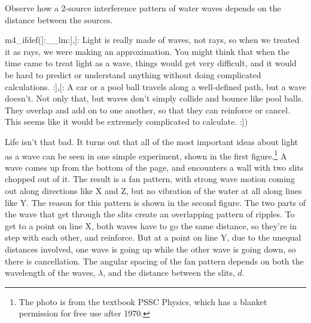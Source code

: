 \label{lab:two-source-interference}

\apparatus
{}

\begin{goals}

\item[] Observe how a 2-source interference
pattern of water waves depends on the distance between the sources.


\end{goals}

\observations

m4_ifdef([:__lm:],[:%
Light is really made of waves, not rays, so when we treated it as
rays, we were making an approximation. You might think that when
the time came to treat light as a wave, things would get very difficult,
and it would be hard to predict or understand anything without doing
complicated calculations.
:],[:%
A car or a pool ball travels along a well-defined path, but a wave doesn't.
Not only that, but waves don't simply collide and bounce like pool balls.
They overlap and add on to one another, so that they can reinforce or cancel.
This seems like it would be extremely complicated to calculate.
:])


Life isn't that bad. It turns out that all of the most important
ideas about light as a wave can be seen in one simple experiment, shown in the
first figure.\footnote{The photo is from the textbook PSSC Physics, which has
a blanket permission for free use after 1970.} A wave comes up from the bottom
of the page, and encounters a wall with two slits chopped out of it. The result
is a fan pattern, with strong wave motion coming out along directions like X and
Z, but no vibration of the water at all along lines like Y. The reason for this
pattern is shown in the second figure. The two parts of the wave that get through
the slits create an overlapping pattern of ripples. To get to a point on line X, both
waves have to go the same distance, so they're in step with each other, and
reinforce. But at a point on line Y, due to the unequal distances involved,
one wave is going up while the other wave is going down, so there is cancellation.
The angular spacing of the fan pattern depends on both the wavelength of the waves,
$\lambda$, and the distance between the slits, $d$.

